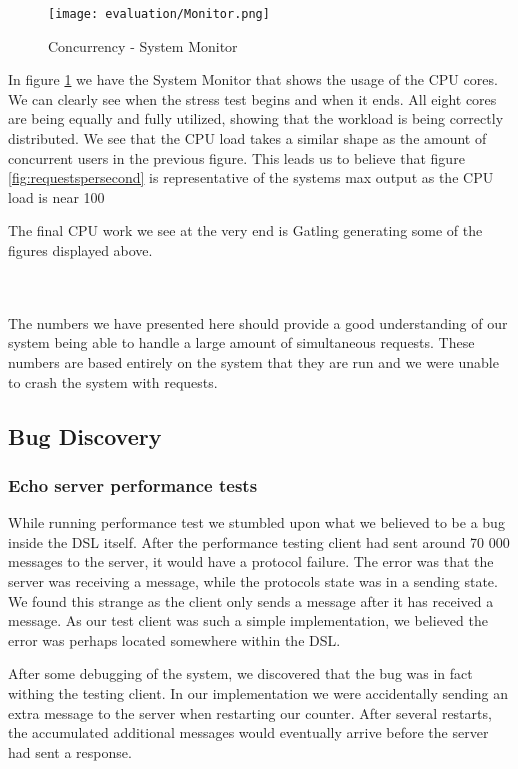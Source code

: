 \begin{figure}[H]
  \centering
  \texttt{[image: evaluation/Monitor.png]}
  \caption{Concurrency - System Monitor}
  \label{fig:monitor}
\end{figure}
In figure \ref{fig:monitor} we have the System Monitor that shows the usage of the CPU cores. We can clearly see when the stress test begins  and when it ends. All eight cores are being equally and fully utilized, showing that the workload is being correctly distributed. We see that the CPU load takes a similar shape as the amount of concurrent users in the previous figure. This leads us to believe that figure \ref{fig:requestspersecond} is representative of the systems max output as the CPU load is near 100%

The final CPU work we see at the very end is Gatling generating some of the figures displayed above.

\\\\
The numbers we have presented here should provide a good understanding of our system being able to handle a large amount of simultaneous requests. These numbers are based entirely on the system that they are run and we were unable to crash the system with requests.  
\subsection{Bug Discovery}
\subsubsection{Echo server performance tests}
While running performance test we stumbled upon what we believed to be a bug inside the DSL itself. After the performance testing client had sent around 70 000 messages to the server, it would have a protocol failure. The error was that the server was receiving a message, while the protocols state was in a sending state. We found this strange as the client only sends a message after it has received a message. As our test client was such a simple implementation, we believed the error was perhaps located somewhere within the DSL.
 
After some debugging of the system, we discovered that the bug was in fact withing the testing client. In our implementation we were accidentally sending an extra message to the server when restarting our counter. After several restarts, the accumulated additional messages would eventually arrive before the server had sent a response.

